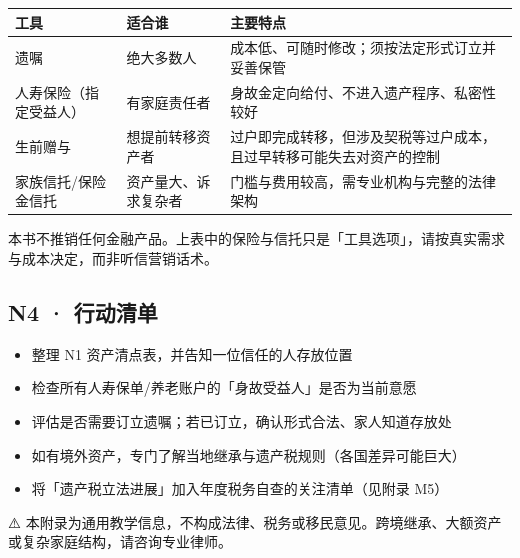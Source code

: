 \documentclass[a4paper,11pt,oneside,fontset=none,UTF8,zihao=-4]{ctexbook}
\providecommand{\tightlist}{\setlength{\itemsep}{2pt}\setlength{\parskip}{1pt}}
\begin{document}
\begin{longtable}[]{@{}
  >{\raggedright\arraybackslash}p{}
  >{\raggedright\arraybackslash}p{}
  >{\raggedright\arraybackslash}p{}@{}}
\toprule\noalign{}\rowcolor{dh-pink!25}
\begin{minipage}[b]{\linewidth}\raggedright
工具
\end{minipage} & \begin{minipage}[b]{\linewidth}\raggedright
适合谁
\end{minipage} & \begin{minipage}[b]{\linewidth}\raggedright
主要特点
\end{minipage} \\
\midrule\noalign{}
\endhead
\bottomrule\noalign{}
\endlastfoot
遗嘱 & 绝大多数人 & 成本低、可随时修改；须按法定形式订立并妥善保管 \\
人寿保险（指定受益人） & 有家庭责任者 &
身故金定向给付、不进入遗产程序、私密性较好 \\
生前赠与 & 想提前转移资产者 &
过户即完成转移，但涉及契税等过户成本，且过早转移可能失去对资产的控制 \\
家族信托/保险金信托 & 资产量大、诉求复杂者 &
门槛与费用较高，需专业机构与完整的法律架构 \\
\end{longtable}

\begin{dhquote}
本书不推销任何金融产品。上表中的保险与信托只是「工具选项」，请按真实需求与成本决定，而非听信营销话术。
\end{dhquote}

\subsection{N4 · 行动清单}\label{n4-ux884cux52a8ux6e05ux5355}

\begin{itemize}
\tightlist
\item
  整理 N1 资产清点表，并告知一位信任的人存放位置
\item
  检查所有人寿保单/养老账户的「身故受益人」是否为当前意愿
\item
  评估是否需要订立遗嘱；若已订立，确认形式合法、家人知道存放处
\item
  如有境外资产，专门了解当地继承与遗产税规则（各国差异可能巨大）
\item
  将「遗产税立法进展」加入年度税务自查的关注清单（见附录 M5）
\end{itemize}

\begin{dhquote}
⚠️
本附录为通用教学信息，不构成法律、税务或移民意见。跨境继承、大额资产或复杂家庭结构，请咨询专业律师。
\end{dhquote}
\end{document}
